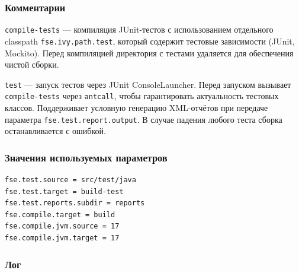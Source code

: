 \subsubsection{Комментарии}

\texttt{compile-tests} — компиляция JUnit-тестов с использованием отдельного classpath \texttt{fse.ivy.path.test}, который содержит тестовые зависимости (JUnit, Mockito). Перед компиляцией директория с тестами удаляется для обеспечения чистой сборки.

\texttt{test} — запуск тестов через JUnit ConsoleLauncher. Перед запуском вызывает \texttt{compile-tests} через \texttt{antcall}, чтобы гарантировать актуальность тестовых классов. Поддерживает условную генерацию XML-отчётов при передаче параметра \texttt{fse.test.report.output}. В случае падения любого теста сборка останавливается с ошибкой.

\subsubsection{Значения используемых параметров}

\begin{lstlisting}[language=Properties,caption={Часть содержимого файла \texttt{build.properties}},captionpos=b]
fse.test.source = src/test/java
fse.test.target = build-test
fse.test.reports.subdir = reports
fse.compile.target = build
fse.compile.jvm.source = 17
fse.compile.jvm.target = 17
\end{lstlisting}

\subsubsection{Лог}


